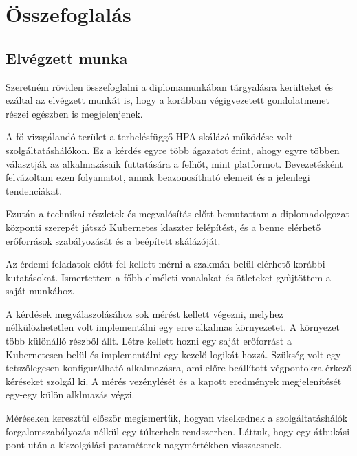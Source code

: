 \chapter{Összefoglalás}
\label{sec:summary}


\section{Elvégzett munka}

Szeretném röviden összefoglalni a diplomamunkában tárgyalásra kerülteket és ezáltal az elvégzett munkát is, hogy a korábban végigvezetett gondolatmenet részei egészben is megjelenjenek.

A fő vizsgálandó terület a terhelésfüggő HPA skálázó működése volt szolgáltatáshálókon.
Ez a kérdés egyre több ágazatot érint, ahogy egyre többen választják az alkalmazásaik futtatására a felhőt, mint platformot.
Bevezetésként felvázoltam ezen folyamatot, annak beazonosítható elemeit és a jelenlegi tendenciákat.

Ezután a technikai részletek és megvalósítás előtt bemutattam a diplomadolgozat központi szerepét játszó Kubernetes klaszter felépítést, és a benne elérhető erőforrások szabályozását és a beépített skálázóját.

Az érdemi feladatok előtt fel kellett mérni a szakmán belül elérhető korábbi kutatásokat. Ismertettem a főbb elméleti vonalakat és ötleteket gyűjtöttem a saját munkához.

A kérdések megválaszolásához sok mérést kellett végezni, melyhez nélkülözhetetlen volt implementálni egy erre alkalmas környezetet. 
A környezet több különálló részből állt.
Létre kellett hozni egy saját erőforrást a Kubernetesen belül és implementálni egy kezelő logikát hozzá.
Szükség volt egy tetszőlegesen konfigurálható alkalmazásra, ami előre beállított végpontokra érkező kéréseket szolgál ki.
A mérés vezénylését és a kapott eredmények megjelenítését egy-egy külön alklmazás végzi.

Méréseken keresztül először megismertük, hogyan viselkednek a szolgáltatáshálók forgalomszabályozás nélkül egy túlterhelt rendszerben. 
Láttuk, hogy egy átbukási pont után a kiszolgálási paraméterek nagymértékben visszaesnek.

